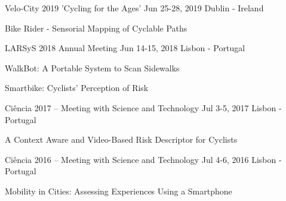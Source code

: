 \begin{cventries}
  \cventrypresentation
    {Velo-City 2019 'Cycling for the Ages'} %
    {Jun 25-28, 2019} %
    {Dublin - Ireland} %
    {
      \begin{cvpresentationitems} %
        \item {} {Bike Rider - Sensorial Mapping of Cyclable Paths}
      \end{cvpresentationitems}
    }


  \cventrypresentation
    {LARSyS 2018 Annual Meeting} %
    {Jun 14-15, 2018} %
    {Lisbon - Portugal} %
    {
      \begin{cvpresentationitems} %
        \item {} {WalkBot: A Portable System to Scan Sidewalks}
        \item {} {Smartbike: Cyclists’ Perception of Risk}
      \end{cvpresentationitems}
    }


  \cventrypresentation
    {Ciência 2017 – Meeting with Science and Technology} %
    {Jul 3-5, 2017} %
    {Lisbon - Portugal} %
    {
      \begin{cvpresentationitems} %
        \item {} {A Context Aware and Video-Based Risk Descriptor for Cyclists}
      \end{cvpresentationitems}
    }


  \cventrypresentation
    {Ciência 2016 – Meeting with Science and Technology} %
    {Jul 4-6, 2016} %
    {Lisbon - Portugal} %
    {
      \begin{cvpresentationitems} %
        \item {} {Mobility in Cities: Assessing Experiences Using a Smartphone}
      \end{cvpresentationitems}
    }

  

\end{cventries}
